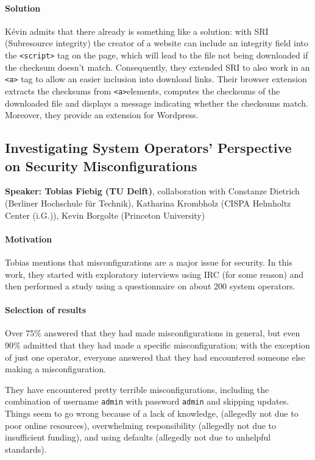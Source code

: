 \documentclass{article}
\begin{document}
\paragraph{Solution} K\'evin admits that there already is something like a solution: with SRI (Subresource integrity) the creator of a website can include an integrity field into the \verb+<script>+ tag on the page, which will lead to the file not being downloaded if the checksum doesn't match. Consequently, they extended SRI to also work in an \verb+<a>+ tag to allow an easier inclusion into download links. Their browser extension extracts the checksums from \verb+<a>+elements, computes the checksums of the downloaded file and displays a message indicating whether the checksums match.
Moreover, they provide an extension for Wordpress.

\subsection{Investigating System Operators’ Perspective on Security Misconfigurations}
\noindent\textbf{Speaker: Tobias Fiebig (TU Delft)}, collaboration with Constanze Dietrich (Berliner Hochschule f\"ur Technik), Katharina Krombholz (CISPA Helmholtz Center (i.G.)), Kevin Borgolte (Princeton University)

\paragraph{Motivation} Tobias mentions that misconfigurations are a major issue for security.  In this work, they started with exploratory interviews using IRC (for some reason) and then performed a study using a questionnaire on about 200 system operators. 

\paragraph{Selection of results}
Over 75\% answered that they had made misconfigurations in general, but even 90\% admitted that they had made a specific misconfiguration; with the exception of just one operator, everyone answered that they had encountered someone else making a misconfiguration.

They have encountered pretty terrible misconfigurations, including the combination of username \verb+admin+ with password \verb+admin+ and skipping updates. Things seem to go wrong because of a lack of knowledge, (allegedly not due to poor online resources), overwhelming responsibility (allegedly not due to insufficient funding), and using defaults (allegedly not due to unhelpful standards).
\end{document}
